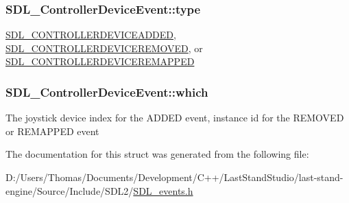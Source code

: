 \subsubsection[{type}]{ S\+D\+L\+\_\+\+Controller\+Device\+Event\+::type}\label{structSDL__ControllerDeviceEvent_a45b3807eaf70a5f5cf712455da277536}
\hyperlink{SDL__events_8h_a3b589e89be6b35c02e0dd34a55f3fccaa9642de478348da1aba4fb5791e8c5314}{S\+D\+L\+\_\+\+C\+O\+N\+T\+R\+O\+L\+L\+E\+R\+D\+E\+V\+I\+C\+E\+A\+D\+D\+E\+D}, \hyperlink{SDL__events_8h_a3b589e89be6b35c02e0dd34a55f3fccaae00ac6995dfb7b92bfae68b9f47ae07a}{S\+D\+L\+\_\+\+C\+O\+N\+T\+R\+O\+L\+L\+E\+R\+D\+E\+V\+I\+C\+E\+R\+E\+M\+O\+V\+E\+D}, or \hyperlink{SDL__events_8h_a3b589e89be6b35c02e0dd34a55f3fccaaeca87c7b5bb21915d444298449a78ee6}{S\+D\+L\+\_\+\+C\+O\+N\+T\+R\+O\+L\+L\+E\+R\+D\+E\+V\+I\+C\+E\+R\+E\+M\+A\+P\+P\+E\+D} \hypertarget{structSDL__ControllerDeviceEvent_accb80de1619c1e790cffb6c888c915db}{}
\subsubsection[{which}]{ S\+D\+L\+\_\+\+Controller\+Device\+Event\+::which}\label{structSDL__ControllerDeviceEvent_accb80de1619c1e790cffb6c888c915db}
The joystick device index for the A\+D\+D\+E\+D event, instance id for the R\+E\+M\+O\+V\+E\+D or R\+E\+M\+A\+P\+P\+E\+D event 

The documentation for this struct was generated from the following file\+:\begin{DoxyCompactItemize}
\item 
D\+:/\+Users/\+Thomas/\+Documents/\+Development/\+C++/\+Last\+Stand\+Studio/last-\/stand-\/engine/\+Source/\+Include/\+S\+D\+L2/\hyperlink{SDL__events_8h}{S\+D\+L\+\_\+events.\+h}\end{DoxyCompactItemize}
